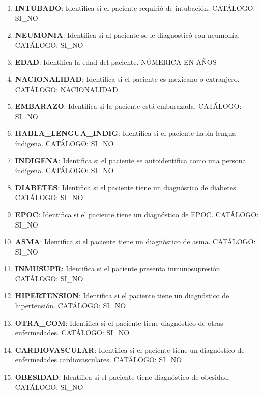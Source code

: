 \begin{enumerate}
	\item \textbf{INTUBADO}: Identifica si el paciente requirió de intubación. CATÁLOGO: SI\_NO                                                                  
	\item \textbf{NEUMONIA}: Identifica si al paciente se le diagnosticó con neumonía. CATÁLOGO: SI\_NO
	\item \textbf{EDAD}: Identifica la edad del paciente. NÚMERICA EN AÑOS
	\item \textbf{NACIONALIDAD}: Identifica si el paciente es mexicano o extranjero. CATÁLOGO: NACIONALIDAD
	\item \textbf{EMBARAZO}: Identifica si la paciente está embarazada. CATÁLOGO: SI\_NO                                                                  
	\item \textbf{HABLA\_LENGUA\_INDIG}: Identifica si el paciente habla lengua índigena. CATÁLOGO: SI\_NO                                                                  
	\item \textbf{INDIGENA}: Identifica si el paciente se autoidentifica como una persona indígena. CATÁLOGO: SI\_NO                                                                  
	\item \textbf{DIABETES}: Identifica si el paciente tiene un diagnóstico de diabetes. CATÁLOGO: SI\_NO
	\item \textbf{EPOC}: Identifica si el paciente tiene un diagnóstico de EPOC. CATÁLOGO: SI\_NO
	\item \textbf{ASMA}: Identifica si el paciente tiene un diagnóstico de asma. CATÁLOGO: SI\_NO
	\item \textbf{INMUSUPR}: Identifica si el paciente presenta inmunosupresión. CATÁLOGO: SI\_NO
	\item \textbf{HIPERTENSION}: Identifica si el paciente tiene un diagnóstico de hipertensión. CATÁLOGO: SI\_NO                                                                  
	\item \textbf{OTRA\_COM}: Identifica si el paciente tiene diagnóstico de otras enfermedades. CATÁLOGO: SI\_NO                                                                  
	\item \textbf{CARDIOVASCULAR}: Identifica si el paciente tiene un diagnóstico de enfermedades cardiovasculares. CATÁLOGO: SI\_NO                                                                  
	\item \textbf{OBESIDAD}: Identifica si el paciente tiene diagnóstico de obesidad. CATÁLOGO: SI\_NO                                                                  

\end{enumerate}
